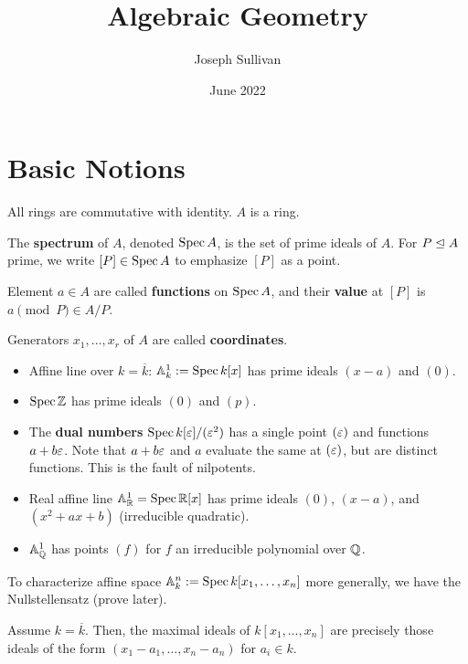 \documentclass[12pt]{article}
\title{Algebraic Geometry}
\author{Joseph Sullivan}
\date{June 2022}
\begin{document}
\maketitle

\section{Basic Notions}

\begin{convention}
    All rings are commutative with identity. $A$ is a ring.
\end{convention}

\begin{defn}
    The \textbf{spectrum} of $A$, denoted $\operatorname{Spec} A$, is the set of prime ideals of $A$. For $P\trianglelefteq A$ prime, we write $[P]\in \operatorname{Spec} A$ to emphasize $[P]$ as a point.
    
    Element $a\in A$ are called \textbf{functions} on $\operatorname{Spec} A$, and their \textbf{value} at $[P]$ is $a \pmod{P} \in A/P$.
    
    Generators $x_1,\dots,x_r$ of $A$ are called \textbf{coordinates}.
\end{defn}

\begin{eg}
    \begin{itemize}
        \item Affine line over $k=\overline{k}$: $\mathbb{A}_k^1 := \operatorname{Spec} k[x]$ has prime ideals $(x-a)$ and $(0)$.
        \item $\operatorname{Spec} \mathbb{Z}$ has prime ideals $(0)$ and $(p)$.
        \item The \textbf{dual numbers} $\operatorname{Spec} k[\varepsilon]/(\varepsilon^2)$ has a single point $(\varepsilon)$ and functions $a+b\varepsilon$. Note that $a+b\varepsilon$ and $a$ evaluate the same at $(\varepsilon)$, but are distinct functions. This is the fault of nilpotents.
        \item Real affine line $\mathbb{A}_{\mathbb{R}}^1 = \operatorname{Spec} \mathbb{R}[x]$ has prime ideals $(0)$, $(x-a)$, and $(x^2+ax+b)$ (irreducible quadratic).
        \item $\mathbb{A}_{\mathbb{Q}}^1$ has points $(f)$ for $f$ an irreducible polynomial over $\mathbb{Q}$.
    \end{itemize}
\end{eg}

To characterize affine space $\mathbb{A}_k^n := \operatorname{Spec} k[x_1,\dots,x_n]$ more generally, we have the Nullstellensatz (prove later).

\begin{thm}
    Assume $k=\overline{k}$. Then, the maximal ideals of $k[x_1,\dots,x_n]$ are precisely those ideals of the form $(x_1-a_1,\dots,x_n-a_n)$ for $a_i\in k$.
\end{thm}
\end{document}
